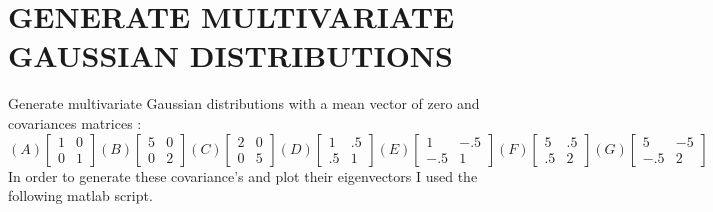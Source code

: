 \documentclass{article}
\begin{document}
\section{\MakeUppercase{Generate multivariate Gaussian distributions}}
\large{Generate multivariate Gaussian distributions with a mean vector of zero and covariances matrices :}
\[
(A)\begin{bmatrix} 
        1 & 0\\
        0 & 1
\end{bmatrix}
(B)\begin{bmatrix} 
        5 & 0\\
        0 & 2
\end{bmatrix}
(C)\begin{bmatrix} 
        2 & 0\\
        0 & 5
\end{bmatrix}
(D)\begin{bmatrix} 
        1 & .5\\
        .5 & 1
\end{bmatrix}
(E)\begin{bmatrix} 
        1 & -.5\\
        -.5 & 1
\end{bmatrix}
(F)\begin{bmatrix} 
        5 & .5\\
        .5 & 2
\end{bmatrix}
(G)\begin{bmatrix} 
        5 & -5\\
        -.5 & 2
\end{bmatrix}
\]
\break\break
In order to generate these covariance's and plot their eigenvectors I used the following matlab script.
\end{document}
